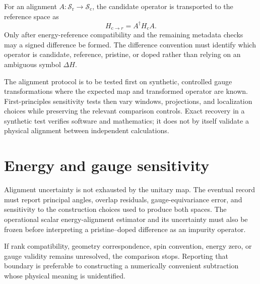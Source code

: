 For an alignment $A:\mathcal S_{\mathrm r}\rightarrow\mathcal S_{\mathrm c}$,
the candidate operator is transported to the reference space as
\begin{equation}
  H_{\mathrm c\rightarrow r}=A^{\dagger}H_{\mathrm c}A.
\end{equation}
Only after energy-reference compatibility and the remaining metadata checks may
a signed difference be formed. The difference convention must identify which
operator is candidate, reference, pristine, or doped rather than relying on an
ambiguous symbol $\Delta H$.

The alignment protocol is to be tested first on synthetic, controlled gauge
transformations where the expected map and transformed operator are known.
First-principles sensitivity tests then vary windows, projections, and
localization choices while preserving the relevant comparison controls. Exact
recovery in a synthetic test verifies software and mathematics; it does not by
itself validate a physical alignment between independent calculations.

\section{Energy and gauge sensitivity}

Alignment uncertainty is not exhausted by the unitary map. The eventual record
must report principal angles, overlap residuals, gauge-equivariance error, and
sensitivity to the construction choices used to produce both spaces. The
operational scalar energy-alignment estimator and its uncertainty must also be
frozen before interpreting a pristine--doped difference as an impurity
operator.

If rank compatibility, geometry correspondence, spin convention, energy zero,
or gauge validity remains unresolved, the comparison stops. Reporting that
boundary is preferable to constructing a numerically convenient subtraction
whose physical meaning is unidentified.
